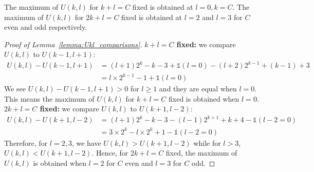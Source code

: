 \documentclass[10pt,a4paper]{amsart}
\begin{document}
\begin{lemma} \label{lemma:Ukl_comparisons}
The maximum of $U(k,l)$ for $k+l=C$ fixed is obtained at $l=0, k=C$. The maximum of $U(k,l)$ for $2k+l=C$ fixed is obtained at $l=2$ and $l=3$ for $C$ even and odd respectively. 
\end{lemma}

\begin{proof}[Proof of Lemma~\ref{lemma:Ukl_comparisons}]
\textbf{$k+l=C$ fixed:} we compare $U(k,l)$ to $U(k-1, l+1)$: 
\begin{align*}
    U(k,l) - U(k-1, l+1) &= (l+1) 2^{k} -k-3 +\mathds{1}(l =0) - (l+2) 2^{k-1} + (k-1)+3  \\
    &= l \times 2^{k-1} -1 + \mathds{1}(l =0) 
\end{align*}
We see $U(k,l) - U(k-1, l+1) >0$ for $l \geq 1$ and they are equal when $l=0$. This means the maximum of $U(k,l)$ for $k+l=C$ fixed is obtained when $l=0$. \\

\noindent \textbf{$2k+l=C$ fixed:} we compare $U(k,l)$ to $U(k+1, l-2)$: 
\begin{align*}
    U(k,l) - U(k+1, l-2) &= (l+1) 2^k -k-3 - (l-1) 2^{k+1} +k+4 -\mathds{1}(l-2 =0) \\
    &= 3 \times 2^k - l \times 2^k +1 -\mathds{1}(l-2 =0)
\end{align*}
Therefore, for $l=2,3$, we have $U(k,l) > U(k+1, l-2)$ while for $l>3$, $U(k,l) < U(k+1, l-2)$. Hence, for $2k+l=C$ fixed, the maximum of $U(k,l)$ is obtained when $l=2$ for $C$ even and $l=3$ for $C$ odd. 
\end{proof}
\end{document}
